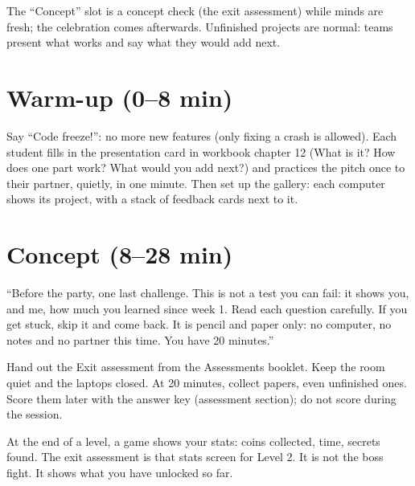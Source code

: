 \begin{teachernote}
The \enquote{Concept} slot is a concept check (the exit assessment) while minds are fresh; the
celebration comes afterwards. Unfinished projects are normal: teams present what works and say what
they would add next.
\end{teachernote}

\section{Warm-up (0--8 min)}
\begin{unplugged}
Say \enquote{Code freeze!}: no more new features (only fixing a crash is allowed). Each student fills in
the presentation card in workbook chapter 12 (What is it? How does one part work? What would you add
next?) and practices the pitch once to their partner, quietly, in one minute. Then set up the gallery:
each computer shows its project, with a stack of feedback cards next to it.
\end{unplugged}

\section{Concept (8--28 min)}
\begin{teacherscript}
“Before the party, one last challenge. This is not a test you can fail: it shows you, and me, how much you
learned since week 1. Read each question carefully. If you get stuck, skip it and come back. It is
pencil and paper only: no computer, no notes and no partner this time. You have 20 minutes.”
\end{teacherscript}
Hand out the Exit assessment from the Assessments booklet. Keep the room quiet and the laptops closed.
At 20 minutes, collect papers, even unfinished ones.
Score them later with the answer key (assessment section); do not score during the session.

\begin{analogy}
At the end of a level, a game shows your stats: coins collected, time, secrets found. The exit
assessment is that stats screen for Level 2. It is not the boss fight. It shows what you have
unlocked so far.
\end{analogy}

